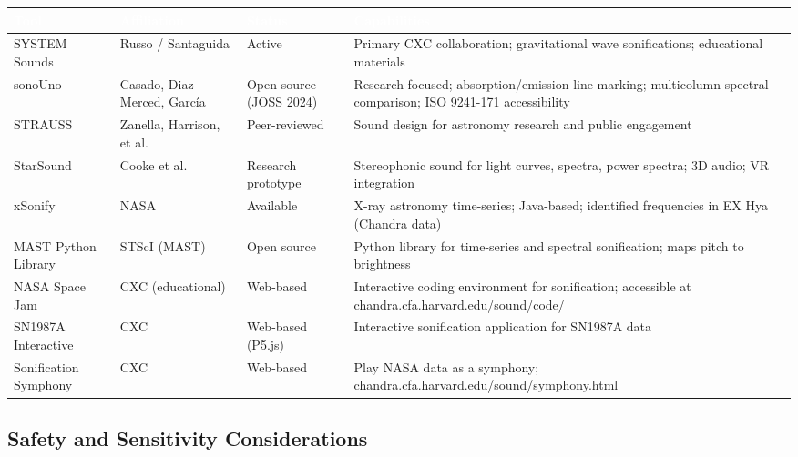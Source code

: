 \documentclass[11pt,letterpaper]{article}
\newcommand{\tableheader}[1]{\textbf{\sffamily\textcolor{white}{#1}}}
\begin{document}
\begin{center}
\begin{tabularx}{\textwidth}{L{3cm}L{2.5cm}L{2cm}X}
\toprule
{}
\tableheader{Tool} & \tableheader{Affiliation} & \tableheader{Status} & \tableheader{Capabilities} \\
\midrule
SYSTEM Sounds & Russo / Santaguida & Active & Primary CXC collaboration; gravitational wave sonifications; educational materials \\
sonoUno & Casado, Diaz-Merced, García & Open source (JOSS 2024) & Research-focused; absorption/emission line marking; multicolumn spectral comparison; ISO 9241-171 accessibility \\
STRAUSS & Zanella, Harrison, et al. & Peer-reviewed & Sound design for astronomy research and public engagement \\
StarSound & Cooke et al. & Research prototype & Stereophonic sound for light curves, spectra, power spectra; 3D audio; VR integration \\
xSonify & NASA & Available & X-ray astronomy time-series; Java-based; identified frequencies in EX Hya (Chandra data) \\
MAST Python Library & STScI (MAST) & Open source & Python library for time-series and spectral sonification; maps pitch to brightness \\
NASA Space Jam & CXC (educational) & Web-based & Interactive coding environment for sonification; accessible at chandra.cfa.harvard.edu/sound/code/ \\
SN1987A Interactive & CXC & Web-based (P5.js) & Interactive sonification application for SN1987A data \\
Sonification Symphony & CXC & Web-based & Play NASA data as a symphony; chandra.cfa.harvard.edu/sound/symphony.html \\
\bottomrule
\end{tabularx}
\end{center}

\subsection{Safety and Sensitivity Considerations}
\end{document}
